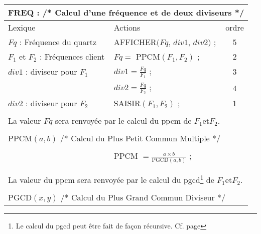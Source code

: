 \begin{center}
{\tt
\begin{tabular}{|l|l|c|}   \hline
\multicolumn{3}{|l|}{FREQ : /* Calcul d'une fr\'equence et de deux diviseurs */}\\
\hline
     Lexique             & Actions                               & ordre \\
\hline
$Fq$ : Fr\'equence du quartz& AFFICHER$(Fq$, $div1$, $div2)$ ;     &   5   \\
$F_{1}$ et $F_{2}$ : Fr\'equences client & $Fq =$ PPCM$(F_{1},F_{2})$ ;   &   2   \\
$div1$ : diviseur pour $F_{1}$ & $div1 = \frac{Fq}{F_{1}}$ ;     &   3   \\
                          & $div2 = \frac{Fq}{F_{2}}$ ;      &   4   \\
$div2$ : diviseur pour $F_{2}$ & SAISIR$(F_{1},F_{2})$ ;              &   1   \\
\hline
\multicolumn{3}{c}{} \\
\multicolumn{3}{l}{La valeur $Fq$ sera renvoy\'ee par le calcul du {\sc ppcm} de
$F_{1} \mbox{et} F_{2}$.}\\
\multicolumn{3}{c}{} \\
\hline
\multicolumn{3}{|l|}{PPCM$(a, b)$
                              /* Calcul du Plus Petit Commun Multiple */ }  \\
\hline
		  &                                  &                \\
                  & PPCM $ = \frac{a\times b}{\mbox{PGCD}(a, b)}$ ; &  \\
		  &                                  &                \\
\hline
\multicolumn{3}{c}{} \\
\multicolumn{3}{l}{La valeur du {\sc ppcm} sera renvoy\'ee par le calcul du
{\sc pgcd}\footnote{Le calcul du {\sc pgcd} peut \^etre fait de fa\c con r\'ecursive.
Cf. page \pageref{Pgcd}} de $F_{1} \mbox{et} F_{2}$.}\\
\multicolumn{3}{c}{} \\
\hline
\multicolumn{3}{|l|}{PGCD$(x, y)$
                              /* Calcul du Plus Grand Commun Diviseur */ }  \\
\hline


\end{tabular}}
\end{center}
